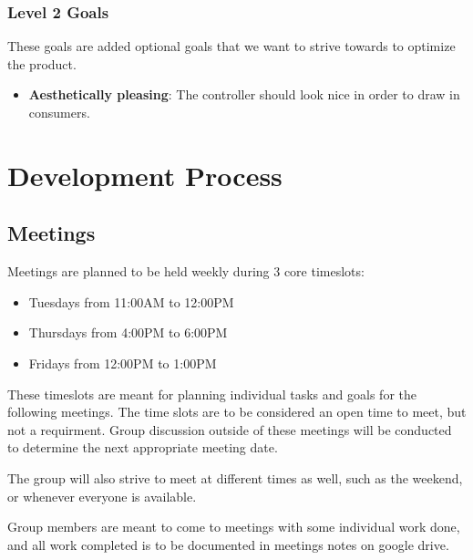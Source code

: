 \documentclass[a4]{article}
\begin{document}
\subsubsection{Level 2 Goals}
These goals are added optional goals that we want to strive towards to optimize the product.
\begin{itemize}
    \item \textcolor{McMasterMaroon}{\textbf{Aesthetically pleasing}}: The controller should look nice in order to draw in consumers.
\end{itemize}
\section{Development Process}
\subsection{Meetings}
Meetings are planned to be held weekly during 3 core timeslots:
\begin{itemize}
    \item Tuesdays from \textcolor{McMasterMaroon}{11:00AM to 12:00PM}
    \item Thursdays from \textcolor{McMasterMaroon}{4:00PM to 6:00PM}
    \item Fridays from \textcolor{McMasterMaroon}{12:00PM to 1:00PM}
\end{itemize}
These timeslots are meant for planning individual tasks and goals for the following meetings. The time slots are to be considered an open time to meet, but not a requirment. Group discussion outside of these meetings will be conducted to determine the next appropriate meeting date.

The group will also strive to meet at different times as well, such as the weekend, or whenever everyone is available.

Group members are meant to come to meetings with some individual work done, and all work completed is to be documented in meetings notes on google drive.
\end{document}
